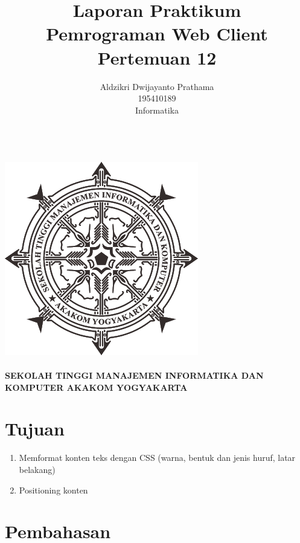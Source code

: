 \documentclass[a4paper,12pt]{article}
\begin{document}
\title{ {\Large Laporan Praktikum}\\ Pemrograman Web Client\\{\Large Pertemuan 12}}

\author{Aldzikri Dwijayanto Prathama 
	\\195410189
	\\Informatika}
\makeatletter
\begin{titlepage}
	\begin{center}
		{\huge \bfseries \@title }\\[14ex]
		\includegraphics[scale=.8]{logo}\\[4ex]
		{\large \@author}\\[12ex]
		{\large \bfseries {SEKOLAH TINGGI MANAJEMEN INFORMATIKA DAN KOMPUTER
				AKAKOM YOGYAKARTA}}
	\end{center}


\end{titlepage}
\makeatother
\renewcommand{\figurename}{Gambar}
\newpage
\tableofcontents
\newpage
\section{Tujuan}
\begin{enumerate}
   \item Memformat konten teks dengan CSS (warna, bentuk dan jenis huruf, latar belakang)
   \item Positioning konten
\end{enumerate}
\newpage

\section{Pembahasan}
\end{document}
